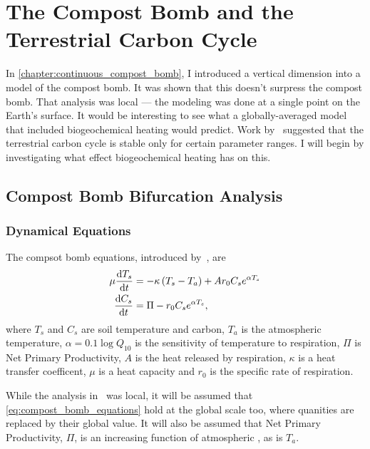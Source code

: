 \chapter{The Compost Bomb and the Terrestrial Carbon Cycle}
\label{chapter:global_bomb}
\graphicspath{{global_bomb/figs/}}


In \cref{chapter:continuous_compost_bomb}, I introduced a vertical dimension into a model of the compost bomb. It was shown that this doesn't
surpress the compost bomb. That analysis was local ---  the modeling was done at a single point on the Earth's surface. It would be interesting to see
what a globally-averaged model that included biogeochemical heating would predict. Work by~\cite{Cox2006} suggested that the terrestrial carbon cycle is stable
only for certain parameter ranges. I will begin by investigating what effect biogeochemical heating has on this.

\section{Compost Bomb Bifurcation Analysis}

\subsection{Dynamical Equations}
The compsot bomb equations, introduced by~\cite{Luke2011}, are
\begin{subequations}
  \label{eq:compost_bomb_equations}
  \begin{align}
    \mu \dv{T_s}{t} &= - \kappa \left(T_s - T_a\right) + Ar_0C_se^{\alpha T_s} \label{eq:compost_bomb_soil_temperature} \\
    \dv{C_s}{t} &= \Pi - r_0C_se^{\alpha T_s}, \label{eq:compost_bomb_soil_carbon}
  \end{align}
\end{subequations}
where $T_s$ and $C_s$ are soil temperature and carbon, $T_a$ is the atmospheric temperature, $\alpha = 0.1\log Q_{10}$ is the sensitivity of
temperature to respiration, $\Pi$ is Net Primary Productivity, $A$ is the heat released by respiration, $\kappa$ is a heat transfer coefficent,
$\mu$ is a heat capacity and $r_0$ is the specific rate of respiration.

While the analysis in~\cite{Luke2011} was local, it will be assumed that \cref{eq:compost_bomb_equations} hold at the global scale too, where quanities are
replaced by their global value. It will also be assumed that Net Primary Productivity, $\Pi$, is an increasing function of atmospheric , as is $T_a$. 

